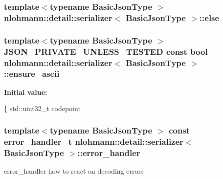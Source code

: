 \subsubsection[{\texorpdfstring{else}{else}}]{\setlength{\rightskip}{0pt plus 5cm}template$<$typename Basic\+Json\+Type $>$ {\bf nlohmann\+::detail\+::serializer}$<$ Basic\+Json\+Type $>$\+::else}\hypertarget{classnlohmann_1_1detail_1_1serializer_ae510f640d26ce0f7d5eb8191b31591c0}{}\label{classnlohmann_1_1detail_1_1serializer_ae510f640d26ce0f7d5eb8191b31591c0}
\subsubsection[{\texorpdfstring{ensure\+\_\+ascii}{ensure_ascii}}]{\setlength{\rightskip}{0pt plus 5cm}template$<$typename Basic\+Json\+Type $>$ {\bf J\+S\+O\+N\+\_\+\+P\+R\+I\+V\+A\+T\+E\+\_\+\+U\+N\+L\+E\+S\+S\+\_\+\+T\+E\+S\+T\+ED} const bool {\bf nlohmann\+::detail\+::serializer}$<$ Basic\+Json\+Type $>$\+::ensure\+\_\+ascii}\hypertarget{classnlohmann_1_1detail_1_1serializer_ab4c340f2a5230f766a833366603a0049}{}\label{classnlohmann_1_1detail_1_1serializer_ab4c340f2a5230f766a833366603a0049}
{\bfseries Initial value\+:}
\begin{DoxyCode}
\{
        std::uint32\_t codepoint
\end{DoxyCode}
\subsubsection[{\texorpdfstring{error\+\_\+handler}{error_handler}}]{\setlength{\rightskip}{0pt plus 5cm}template$<$typename Basic\+Json\+Type $>$ const {\bf error\+\_\+handler\+\_\+t} {\bf nlohmann\+::detail\+::serializer}$<$ Basic\+Json\+Type $>$\+::error\+\_\+handler}\hypertarget{classnlohmann_1_1detail_1_1serializer_a09d5a046fb0f7cb61977d6e5fbe8b3a1}{}\label{classnlohmann_1_1detail_1_1serializer_a09d5a046fb0f7cb61977d6e5fbe8b3a1}


error\+\_\+handler how to react on decoding errors 

